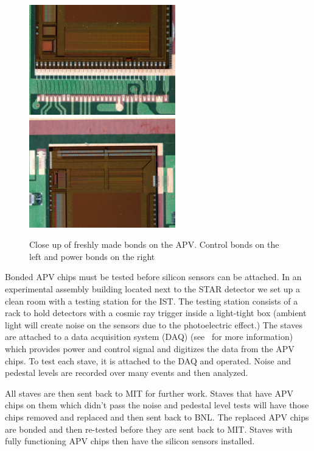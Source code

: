 \documentclass[preprint,12pt]{elsarticle}
\begin{document}
\begin{figure}[h]
\begin{center}
\includegraphics[width=2.5in, keepaspectratio=true, angle=0]{graphics/control.jpg}
\includegraphics[width=2.5in, keepaspectratio=true, angle=0]{graphics/power.jpg}
\caption{Close up of freshly made bonds on the APV.  Control bonds on the left
and power bonds on the right
\label{fig:apv_bond}}
\end{center}
\end{figure}

Bonded APV chips must be tested before silicon sensors can be attached. In an
experimental assembly building located next to the STAR detector we set up a
clean room with a testing station for the IST. The testing station consists of
a rack to hold detectors with a cosmic ray trigger inside a light-tight box
(ambient light will create noise on the sensors due to the photoelectric effect.)
The staves are attached to a data acquisition system (DAQ) (see~\cite{ref:daq} for more information)
which provides power and control signal and digitizes the data from the APV
chips. To test each stave, it is attached to the DAQ and operated. Noise and pedestal levels
are recorded over many events and then analyzed.

All staves are then sent back to MIT for further work. Staves that have APV
chips on them which didn’t pass the noise and pedestal level tests will have
those chips removed and replaced and then sent back to BNL. The replaced APV
chips are bonded and then re-tested before they are sent back to MIT. Staves
with fully functioning APV chips then have the silicon sensors installed.
\end{document}
